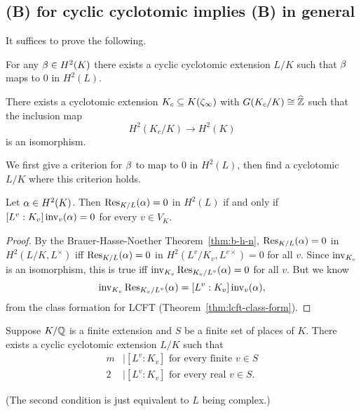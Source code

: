 \subsection{(B) for cyclic cyclotomic implies (B) in general}
It suffices to prove the following.
\begin{thm}
For any $\beta\in H^2(K)$ there exists a cyclic cyclotomic extension $L/K$ such that $\beta$ maps to 0 in $H^2(L)$.

There exists a cyclotomic extension $K_c\subseteq K(\zeta_{\infty})$ with $G(K_c/K)\cong \widehat{\mathbb{Z}}$ such that the inclusion map
\[
H^2(K_c/K)\to H^2(K)
\]
is an isomorphism.
\end{thm}
We first give a criterion for $\beta$ to map to 0 in $H^2(L)$, then find a cyclotomic $L/K$ where this criterion holds.
\begin{lem}
Let $\alpha \in H^2(K)$. Then $\operatorname{Res}_{K/L}(\alpha)=0$ in $H^2(L)$ if and only if $[L^v:K_v]\operatorname{inv}_v(\alpha)=0$ for every $v\in V_K$. 
\end{lem}
\begin{proof}
By the Brauer-Hasse-Noether Theorem~\ref{thm:b-h-n}, $\operatorname{Res}_{K/L}(\alpha)=0$ in $H^2(L/K, L^{\times})$ iff $\operatorname{Res}_{K/L}(\alpha)=0$ in $H^2(L^v/K_v,L^{v\times})=0$ for all $v$. Since $\operatorname{inv}_{K_v}$ is an isomorphism, this is true iff $\operatorname{inv}_{K_v}\operatorname{Res}_{K_v/L^v}(\alpha)=0$ for all $v$. But we know 
\[\operatorname{inv}_{K_v}\operatorname{Res}_{K_v/L^v}(\alpha)=[L^v:K_v]\operatorname{inv}_v(\alpha),\]
from the class formation for LCFT (Theorem~\ref{thm:lcft-class-form}).
\end{proof}
\begin{lem}
Suppose $K/\mathbb{Q}$ is a finite extension and $S$ be a finite set of places of $K$. 
There exists a cyclic cyclotomic extension $L/K$ such that
\begin{align*}
m&\mid [L^v:K_v]\text{ for every finite }v\in S\\
2&\mid [L^v:K_v]\text{ for every real }v\in S.
\end{align*}
\end{lem}
(The second condition is just equivalent to $L$ being complex.)
